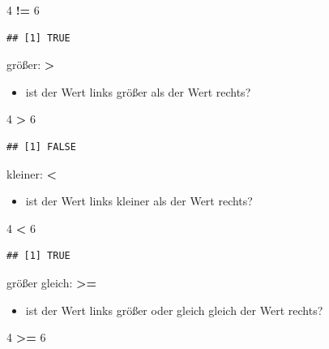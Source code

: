 \documentclass[]{book}
\newenvironment{Shaded}{\begin{snugshade}}{\end{snugshade}}
\newcommand{\DecValTok}[1]{\textcolor[rgb]{0.00,0.00,0.81}{#1}}
\newcommand{\StringTok}[1]{\textcolor[rgb]{0.31,0.60,0.02}{#1}}
\newcommand{\OperatorTok}[1]{\textcolor[rgb]{0.81,0.36,0.00}{\textbf{#1}}}
\providecommand{\tightlist}{%
  \setlength{\itemsep}{0pt}\setlength{\parskip}{0pt}}
\begin{document}
\begin{Shaded}
\begin{Highlighting}[]
\DecValTok{4} \OperatorTok{!=}\StringTok{ }\DecValTok{6}
\end{Highlighting}
\end{Shaded}

\begin{verbatim}
## [1] TRUE
\end{verbatim}

größer: \textbf{\textgreater{}}

\begin{itemize}
\tightlist
\item
  ist der Wert links größer als der Wert rechts?
\end{itemize}

\begin{Shaded}
\begin{Highlighting}[]
\DecValTok{4} \OperatorTok{>}\StringTok{ }\DecValTok{6}
\end{Highlighting}
\end{Shaded}

\begin{verbatim}
## [1] FALSE
\end{verbatim}

kleiner: \textbf{\textless{}}

\begin{itemize}
\tightlist
\item
  ist der Wert links kleiner als der Wert rechts?
\end{itemize}

\begin{Shaded}
\begin{Highlighting}[]
\DecValTok{4} \OperatorTok{<}\StringTok{ }\DecValTok{6}
\end{Highlighting}
\end{Shaded}

\begin{verbatim}
## [1] TRUE
\end{verbatim}

größer gleich: \textbf{\textgreater{}=}

\begin{itemize}
\tightlist
\item
  ist der Wert links größer oder gleich gleich der Wert rechts?
\end{itemize}

\begin{Shaded}
\begin{Highlighting}[]
\DecValTok{4} \OperatorTok{>=}\StringTok{ }\DecValTok{6}
\end{Highlighting}
\end{Shaded}
\end{document}
